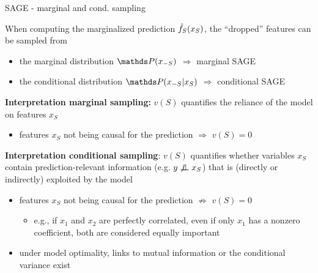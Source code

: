 \documentclass[10pt,compress,t,notes=noshow, xcolor=table]{beamer}
\begin{document}
\begin{frame}{SAGE - marginal and cond. sampling}

When computing the marginalized prediction $\hat{f}_S(x_S)$, the ``dropped'' features can be sampled from \\
\begin{itemize}
\item the marginal distribution $\P(x_{-S})$ $\Rightarrow$ marginal SAGE
\item the conditional distribution $\P(x_{-S}|x_S)$ $\Rightarrow$ conditional SAGE
\end{itemize}



\lz\pause

\textbf{Interpretation marginal sampling:} $v(S)$ quantifies the reliance of the model on features $x_S$
\begin{itemize}
  \item %
  features $x_S$ not being causal for the prediction $\Rightarrow$ $v(S) = 0$
\end{itemize}

\lz\pause

\textbf{Interpretation conditional sampling}: $v(S)$ quantifies whether variables $x_S$ contain prediction-relevant information (e.g. $y \not \perp \!\!\! \perp x_S$) that is (directly or indirectly) exploited by the model
\begin{itemize}
  \item %
  features $x_S$ not being causal for the prediction $\not \Rightarrow$ $v(S) = 0$
  \begin{itemize}
      \item e.g., if $x_1$ and $x_2$ are perfectly correlated, even if only $x_1$ has a nonzero coefficient, both are considered equally important
  \end{itemize}
  \item under model optimality, links to mutual information or the conditional variance exist
\end{itemize}

\end{frame}
\end{document}
